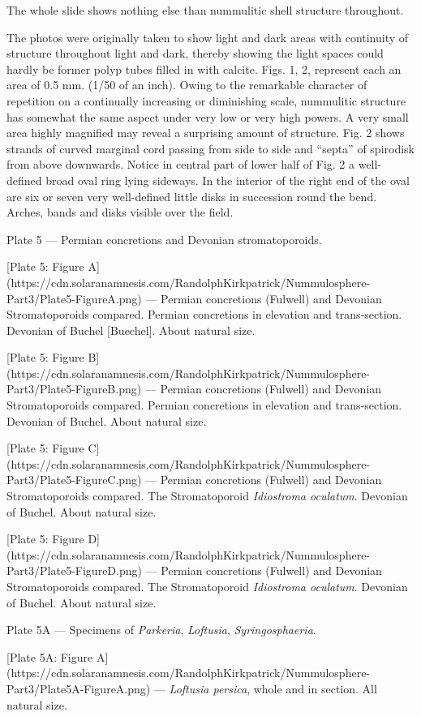 \documentclass[a4paper, 12pt, oneside]{article}
\begin{document}
The whole slide shows nothing else than nummulitic shell structure throughout.

The photos were originally taken to show light and dark areas with continuity of structure throughout light and dark, thereby showing the light spaces could hardly be former polyp tubes filled in with calcite. Figs. 1, 2, represent each an area of 0.5 mm. (1/50 of an inch). Owing to the remarkable character of repetition on a continually increasing or diminishing scale, nummulitic structure has somewhat the same aspect under very low or very high powers. A very small area highly magnified may reveal a surprising amount of structure. Fig. 2 shows strands of curved marginal cord passing from side to side and ``septa'' of spirodisk from above downwards. Notice in central part of lower half of Fig. 2 a well-defined broad oval ring lying sideways. In the interior of the right end of the oval are six or seven very well-defined little disks in succession round the bend. Arches, bands and disks visible over the field.

Plate 5 --- Permian concretions and Devonian stromatoporoids.

[Plate 5: Figure A](https://cdn.solaranamnesis.com/RandolphKirkpatrick/Nummulosphere-Part3/Plate5-FigureA.png) --- Permian concretions (Fulwell) and Devonian Stromatoporoids compared. Permian concretions in elevation and trans-section. Devonian of Buchel [Buechel]. About natural size.

[Plate 5: Figure B](https://cdn.solaranamnesis.com/RandolphKirkpatrick/Nummulosphere-Part3/Plate5-FigureB.png) --- Permian concretions (Fulwell) and Devonian Stromatoporoids compared. Permian concretions in elevation and trans-section. Devonian of Buchel. About natural size.

[Plate 5: Figure C](https://cdn.solaranamnesis.com/RandolphKirkpatrick/Nummulosphere-Part3/Plate5-FigureC.png) --- Permian concretions (Fulwell) and Devonian Stromatoporoids compared. The Stromatoporoid \emph{Idiostroma oculatum}. Devonian of Buchel. About natural size.

[Plate 5: Figure D](https://cdn.solaranamnesis.com/RandolphKirkpatrick/Nummulosphere-Part3/Plate5-FigureD.png) --- Permian concretions (Fulwell) and Devonian Stromatoporoids compared. The Stromatoporoid \emph{Idiostroma oculatum}. Devonian of Buchel. About natural size.

Plate 5A --- Specimens of \emph{Parkeria}, \emph{Loftusia}, \emph{Syringosphaeria}.

[Plate 5A: Figure A](https://cdn.solaranamnesis.com/RandolphKirkpatrick/Nummulosphere-Part3/Plate5A-FigureA.png) --- \emph{Loftusia persica}, whole and in section. All natural size.
\end{document}
